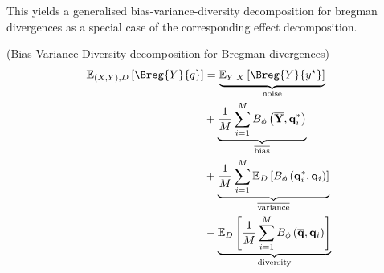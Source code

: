 \documentclass[../main.tex]{subfiles}
\begin{document}
This yields a generalised bias-variance-diversity decomposition for bregman divergences as a special case of the corresponding effect decomposition.


\begin{theorem} (Bias-Variance-Diversity decomposition for Bregman divergences)
    \label{thm:bregman-diversity-decomp}
\begin{align*}
\mathbb{E}_{(X,Y), D}\left[ \Breg{Y}{q} \right]  
&= \underbrace{\mathbb{E}_{Y|X}\left[ \Breg{Y}{y^\star} \right]   }_{\text{noise}} \\
&+
\underbrace{
    \frac{1}{M} \sum_{i=1}^M B_\phi\left(\overline{\mathbf{Y}}, \mathbf{q}_i^*\right)
}_{\overline{\text{bias}}} \\
&+
\underbrace{
    \frac{1}{M} \sum_{i=1}^M \mathbb{E}_D\left[B_\phi\left(\mathbf{q}_i^*, \mathbf{q}_i\right)\right]
}_{\overline{\text{variance}}} \\
&-
\underbrace{
    \mathbb{E}_D\left[\frac{1}{M} \sum_{i=1}^M B_\phi\left(\overline{\mathbf{q}}, \mathbf{q}_i\right)\right]
}_{\text{diversity}}
\end{align*}
\end{theorem}



\end{document}
